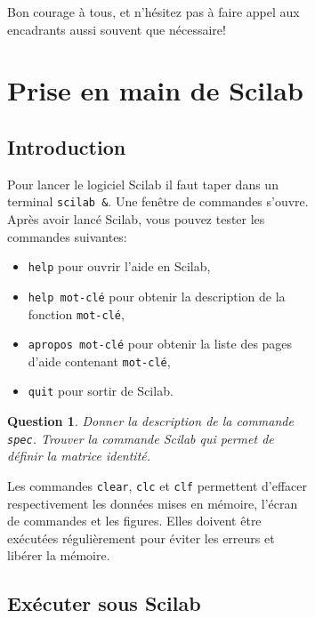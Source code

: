 \documentclass[a4paper,11pt]{article}
\newtheorem{question}{Question}
\begin{document}
\begin{figure}
\begin{figure}
Bon courage à tous, et n'hésitez pas à faire appel aux encadrants
aussi souvent que nécessaire!


\section{Prise en main de Scilab }

\subsection{Introduction}

Pour lancer le logiciel Scilab il faut taper dans un terminal \verb+scilab &+. Une fenêtre de commandes
s'ouvre.  Après avoir lancé Scilab, vous pouvez tester les commandes
suivantes:
\begin{itemize}
\item \verb+help+ pour ouvrir l'aide en Scilab,
\item \verb+help mot-clé+ pour obtenir la description de la fonction
    \verb+mot-clé+,
\item \verb+apropos mot-clé+ pour obtenir la liste des pages d'aide
    contenant \verb+mot-clé+,
\item \verb+quit+ pour sortir de Scilab.
\end{itemize}

\begin{question} Donner la description de la commande {\tt spec}.
  Trouver la commande Scilab qui permet de définir la matrice identité.
\end{question}

Les commandes \verb+clear+, \verb+clc+ et \verb+clf+ permettent
d'effacer respectivement les données mises en mémoire, l'écran de
commandes et les figures. Elles doivent être exécutées régulièrement
pour éviter les erreurs et libérer la mémoire.

\subsection{Exécuter sous Scilab}


\end{figure}
\end{figure}
\end{document}
